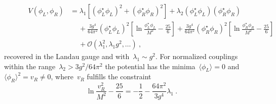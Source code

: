 \documentclass[reqno,11pt]{amsart}
\numberwithin{equation}{section}
\newcommand{\1}{\mbox{\rm 1 \hspace{-1.05 em} 1}}
\renewcommand{\O}{\mathscr{O}}
\renewcommand{\O}{{\mathscr{O}}}
\begin{document}
\begin{enumerate}[leftmargin=2em]
\begin{align*}
\qquad \quad V(\phi_L, \phi_R) &= \lambda_1 \left[ (\phi_L^\star \phi_L)^2 + (\phi_R^\star \phi_R)^2 \right] + \lambda_2 (\phi_L^\star \phi_L)(\phi_R^\star \phi_R) \\
&\quad\:+ \frac{3 g^4}{64 \pi^2} (\phi_L^\star \phi_L)^2 \!\! \left[ \ln \frac{\phi_L^\star \phi_L}{M^2} -\frac{25}{6}\right] 
\!\!+\!\! \frac{3 g^4}{64 \pi^2} (\phi_R^\star \phi_R)^2 \left[ \ln \frac{\phi_R^\star \phi_R}{M^2} -\frac{25}{6}\right] \\
&\quad\: + \O(\lambda_1^2, \lambda_1g^2, \dots)\:,
\end{align*}
recovered in the Landau gauge and with~$\lambda_1\sim g^2$. For normalized couplings within the range~$\lambda_2 > 3 g^2 / 64 \pi^2$ the potential has the minima~$\langle\phi_L \rangle=0$ and~$\langle\phi_R \rangle^2=v_R\neq 0$, where~$v_R$ fulfills the constraint
\[ \ln \frac{v_R^2}{M^2}   -\frac{25}{6} = -\frac{1}{2} - \frac{64 \pi^2}{3 g^4} \lambda_1 \:. \]


\end{enumerate}
\end{document}
